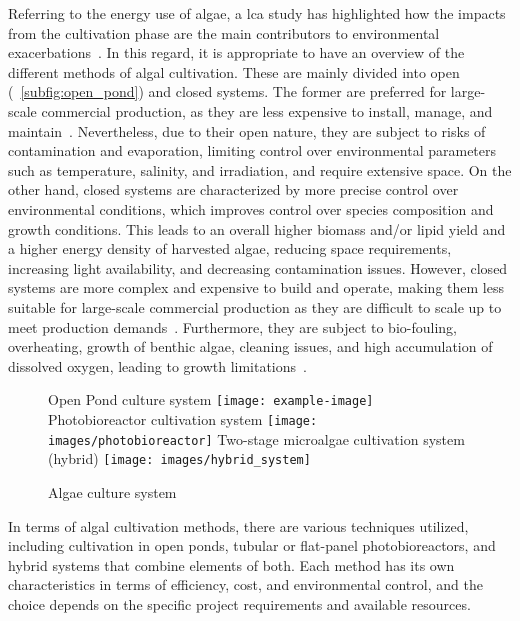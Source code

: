 Referring to the energy use of algae, a \gls{lca} study has highlighted how the impacts from the cultivation phase are the main contributors to environmental exacerbations~\parencite{clarens_Environmental_2010}. In this regard, it is appropriate to have an overview of the different methods of algal cultivation. These are mainly divided into open (\fig{}~\ref{subfig:open_pond}) and closed systems. The former are preferred for large-scale commercial production, as they are less expensive to install, manage, and maintain~\parencite{roselet_Comparison_2013}. Nevertheless, due to their open nature, they are subject to risks of contamination and evaporation, limiting control over environmental parameters such as temperature, salinity, and irradiation, and require extensive space. On the other hand, closed systems are characterized by more precise control over environmental conditions, which improves control over species composition and growth conditions. This leads to an overall higher biomass and/or lipid yield and a higher energy density of harvested algae, reducing space requirements, increasing light availability, and decreasing contamination issues. However, closed systems are more complex and expensive to build and operate, making them less suitable for large-scale commercial production as they are difficult to scale up to meet production demands~\parencite{resurreccion_Comparison_2012}. Furthermore, they are subject to bio-fouling, overheating, growth of benthic algae, cleaning issues, and high accumulation of dissolved oxygen, leading to growth limitations~\parencite{narala_Comparison_2016}.

\begin{figure}[H]
\centering
	\subcaptionbox%
		{Open Pond culture system\label{subfig:open_pond}}%
		{\texttt{[image: example-image]}}%
\hspace*{\trehbtwsfig}%
	\subcaptionbox%
		{Photobioreactor cultivation system\label{subfig:photobioreactor}}%
		{\texttt{[image: images/photobioreactor]}}%
\hspace*{\trehbtwsfig}%
	\subcaptionbox%
		{Two-stage microalgae cultivation system (hybrid)\label{subfig:hybrid_system}}%
		{\texttt{[image: images/hybrid\_system]}}%
\caption%
{Algae culture system}
\label{fig:algae_culture_system}
\end{figure}


In terms of algal cultivation methods, there are various techniques utilized, including cultivation in open ponds, tubular or flat-panel photobioreactors, and hybrid systems that combine elements of both. Each method has its own characteristics in terms of efficiency, cost, and environmental control, and the choice depends on the specific project requirements and available resources.

